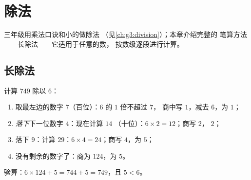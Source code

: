 \chapter{除法}\label{ch:g4:division}

三年级用乘法口诀和小的做除法
（见\cref{ch:g3:division}）；本章介绍完整的
笔算方法——长除法——它适用于任意的数，
按数级逐段进行计算。

\section{长除法}

\begin{method}[用一位数做除数的长除法]\label{met:g4:division:method}
计算 $749$ 除以 $6$：
\begin{enumerate}
  \item 取最左边的数字 $7$（百位）：$6$ 的 $1$ 倍不超过 $7$，
        商中写 $1$，减去
        $6$，为 $1$；
  \item \emph{落下}下一位数字 $4$：现在计算 $14$
        （十位）：$6 \times 2 = 12$；商写 $2$， $2$；
  \item 落下 $9$：计算 $29$：$6 \times 4 = 24$；商写
        $4$，为 $5$；
  \item 没有剩余的数字了：商为 $124$，为 $5$。
\end{enumerate}
验算：$6 \times 124 + 5 = 744 + 5 = 749$，且 $5 < 6$。
\end{method}

